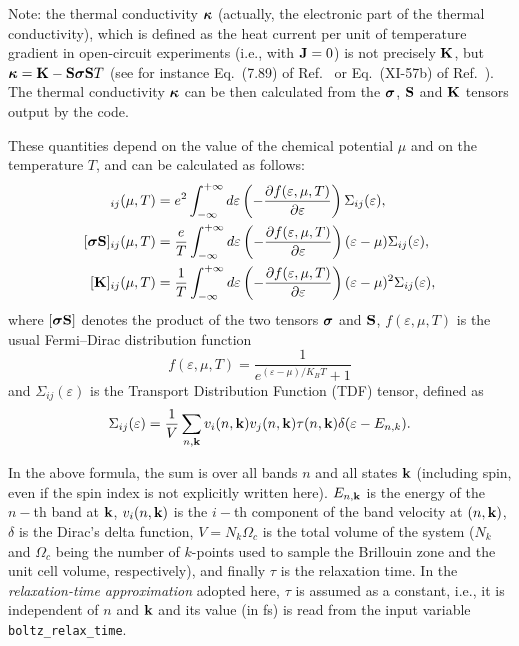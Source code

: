 Note: the thermal conductivity $\bm{\mathrm{\kappa}}$ (actually, the electronic part of the thermal conductivity), which is defined as the heat current per unit of temperature gradient in open-circuit experiments (i.e., with $\bm{\mathrm{J}}=0$) is not precisely $\bm{\mathrm{K}}$, but  $\bm{\mathrm{\kappa}} = \bm{\mathrm{K}}-\bm{\mathrm{S}} \bm{\mathrm{\sigma}} \bm{\mathrm{S}} T$ (see for instance Eq.~(7.89) of Ref.~\cite{ziman-book72} or Eq.~(XI-57b) of Ref.~\cite{grosso-book00}).
The thermal conductivity $\bm{\mathrm{\kappa}}$ can be then calculated from the $\bm{\mathrm{\sigma}}$, $\bm{\mathrm{S}}$ and $\bm{\mathrm{K}}$ tensors output by the code.

These quantities depend on the value of the chemical potential $\mu$ and on the temperature $T$, and can be calculated as follows:
\begin{align}
  [\bvec \sigma]_{ij}(\mu,T)&=e^2 \int_{-\infty}^{+\infty} d\varepsilon \left(-\frac {\partial f(\varepsilon,\mu,T)}{\partial \varepsilon}\right)\Sigma_{ij}(\varepsilon), \\
  [\bvec \sigma \bvec S]_{ij}(\mu,T)&=\frac e T \int_{-\infty}^{+\infty} d\varepsilon \left(-\frac {\partial f(\varepsilon,\mu,T)}{\partial \varepsilon}\right)(\varepsilon-\mu)\Sigma_{ij}(\varepsilon), \label{eq:boltz-sigmas}\\
  [\bvec K]_{ij}(\mu,T)&=\frac 1 T \int_{-\infty}^{+\infty} d\varepsilon \left(-\frac {\partial f(\varepsilon,\mu,T)}{\partial \varepsilon}\right)(\varepsilon-\mu)^2 \Sigma_{ij}(\varepsilon),\label{eq:boltz-thermcond}
\end{align}
where $[\bm{\mathrm{\sigma}} \bm{\mathrm{S}}]$ denotes the product of the two tensors $\bm{\mathrm{\sigma}}$ and $\bm{\mathrm{S}}$, $f(\varepsilon,\mu,T)$ is the usual Fermi--Dirac distribution function 
\begin{equation*}
  f(\varepsilon,\mu,T) = \frac{1}{e^{(\varepsilon-\mu)/K_B T}+1}
\end{equation*}
and $\Sigma_{ij}(\varepsilon)$ is the Transport Distribution Function (TDF) tensor, defined as
\begin{equation*}
  \Sigma_{ij}(\varepsilon) = \frac 1 V \sum_{n,\bm{\mathrm{k}}} v_i(n,\bm{\mathrm{k}}) v_j(n,\bm{\mathrm{k}}) \tau(n,\bm{\mathrm{k}}) \delta(\varepsilon - E_{n,k}).
\end{equation*}

In the above formula, the sum is over all bands $n$ and all states $\bm{\mathrm{k}}$ (including spin, even if the spin index is not explicitly written here). $E_{n,\bm{\mathrm{k}}}$ is the energy of the $n-$th band at $\bm{\mathrm{k}}$, $v_i(n,\bm{\mathrm{k}})$ is the $i-$th component of the band velocity at $(n,\bm{\mathrm{k}})$, $\delta$ is the Dirac's delta function, $V = N_k \Omega_c$ is the total volume of the system ($N_k$ and $\Omega_c$ being the number of $k$-points used to sample the Brillouin zone and the unit cell volume, respectively), and finally $\tau$ is the relaxation time. In the \emph{relaxation-time approximation} adopted here, $\tau$ is assumed as a constant, i.e., it is independent of $n$ and $\bm{\mathrm{k}}$ and its value (in fs) is read from the input variable \verb#boltz_relax_time#.

